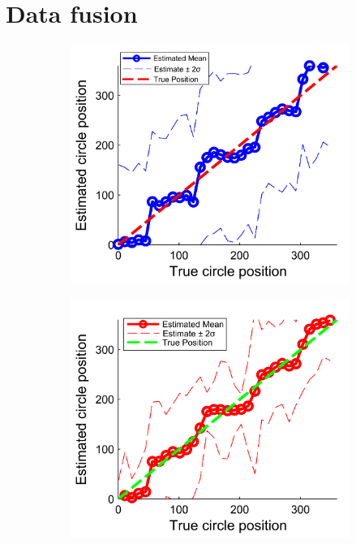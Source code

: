 \section{Data fusion}
\begin{figure}
	\centering
	\begin{subfigure}{7cm}
	\includegraphics[scale=1]{circular_line_fusion_mean_1report.png}
	\caption{}	
	\label{Figure: circular_fusion_mean_1}
	\end{subfigure}
	\begin{subfigure}{7cm}
	\includegraphics[scale=1]{line_circular_fusion_mean_5.png}

\end{subfigure}
\end{figure}
